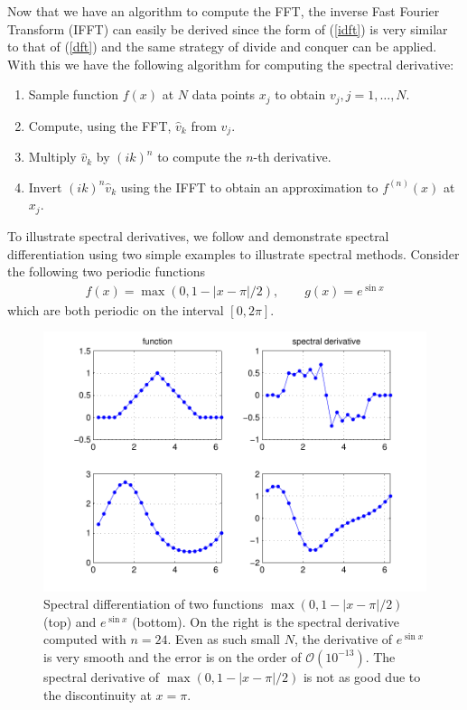 Now that we have an algorithm to compute the FFT, the inverse Fast Fourier Transform (IFFT) can easily be derived since the form of (\ref{idft}) is very similar to that of (\ref{dft}) and the same strategy of divide and conquer can be applied. With this we have the following algorithm for computing the spectral derivative:
\begin{enumerate} 
\item Sample function $f(x)$ at $N$ data points $x_{j}$ to obtain $v_{j}, j=1,\ldots,N$.
\item Compute, using the FFT, $\hat{v}_{k}$ from $v_{j}$.
\item Multiply $\hat{v}_{k}$ by $(ik)^{n}$ to compute the $n$-th derivative.
\item Invert $(ik)^{n}\hat{v}_{k}$ using the IFFT  to obtain an approximation to $f^{(n)}(x)$ at $x_{j}$. 
\end{enumerate}

To illustrate spectral derivatives, we follow \cite{trefethen_spectral} and demonstrate spectral differentiation using two simple examples to illustrate spectral methods. Consider the following two periodic functions
\begin{align}
f(x) = \max(0,1-|x-\pi|/2), \qquad g(x)=e^{\sin x}
\end{align}
which are both periodic on the interval $[0,2\pi]$. 
\begin{figure}
\begin{center}
\includegraphics[width=\textwidth]{spectral_derivatives.pdf}
\caption{Spectral differentiation of two functions $\max(0,1-|x-\pi|/2)$ (top) and $e^{\sin x}$ (bottom). On the right is the spectral derivative computed with $n=24$. Even as such small $N$, the derivative of $e^{\sin x}$ is very smooth and the error is on the order of $\mathcal{O}(10^{-13})$. The spectral derivative of $\max(0,1-|x-\pi|/2)$ is not as good due to the discontinuity at $x=\pi$.}
\label{spectral_derivatives}
\end{center}
\end{figure}

